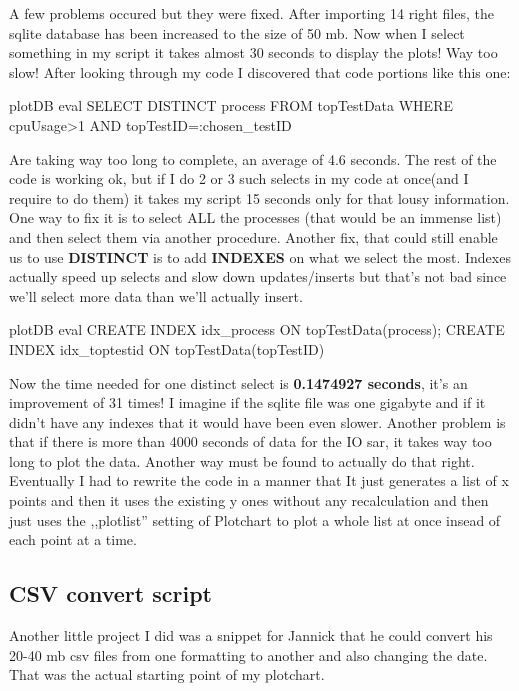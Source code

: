 A few problems occured but they were fixed.
After importing 14 right files, the \gls{sqlite} database has been increased to the size of 50 mb. Now when I select something in my script it takes almost 30 seconds to display the plots! Way too slow! After looking through my code I discovered that code portions like this one:
\begin{codelisting}
plotDB eval {SELECT DISTINCT process  FROM topTestData WHERE cpuUsage>1 AND topTestID=:chosen_testID  }
\end{codelisting}
Are taking way too long to complete, an average of 4.6 seconds. The rest of the code is working ok, but if I do 2 or 3 such selects in my code at once(and I require to do them) it takes my script 15 seconds only for that lousy information.
One way to fix it is to select ALL the processes (that would be an immense list) and then select them via another procedure. 
Another fix, that could still enable us to use \textbf{DISTINCT} is to add \textbf{INDEXES} on what we select the most.
Indexes actually speed up selects and slow down updates/inserts but that's not bad since we'll select more data than we'll actually insert.
\begin{codelisting}
plotDB eval {CREATE INDEX idx_process ON topTestData(process); CREATE INDEX idx_toptestid ON topTestData(topTestID)}
\end{codelisting}
Now the time needed for one distinct select is \textbf{0.1474927 seconds}, it's an improvement of 31 times! I imagine if the \gls{sqlite} file was one gigabyte and if it didn't have any indexes that it would have been even slower.
Another problem is that if there is more than 4000 seconds of data for the IO sar, it takes way too long to plot the data. Another way must be found to actually do that right.
Eventually I had to rewrite the code in a manner that It just generates a list of x points and then it uses the existing y ones without any recalculation and then just uses the ,,plotlist'' setting of Plotchart to plot a whole list at once insead of each point at a time.
\subsection{CSV convert script}
Another little project I did was a snippet for Jannick that he could convert his 20-40 mb \gls{csv} files from one formatting to another and also changing the date.
That was the actual starting point of my plotchart.


